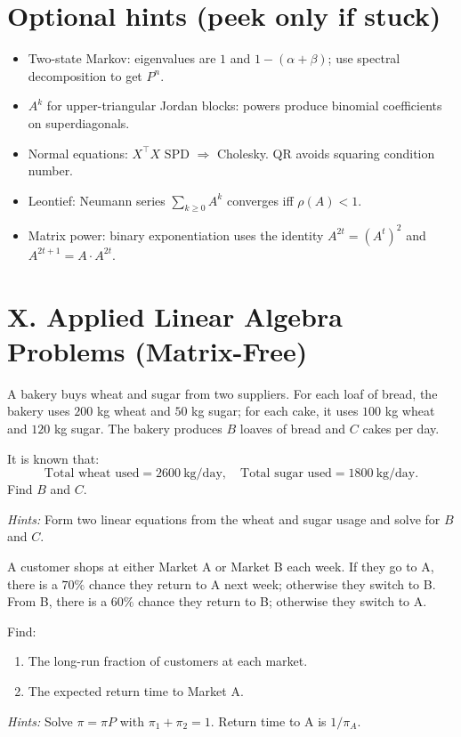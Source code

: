 \documentclass[11pt]{article}
\begin{document}
\section*{Optional hints (peek only if stuck)}
\begin{itemize}
\item Two-state Markov: eigenvalues are $1$ and $1-(\alpha+\beta)$; use spectral decomposition to get $P^n$.
\item $A^k$ for upper-triangular Jordan blocks: powers produce binomial coefficients on superdiagonals.
\item Normal equations: $X^\top X$ SPD $\Rightarrow$ Cholesky. QR avoids squaring condition number.
\item Leontief: Neumann series $\sum_{k\ge0}A^k$ converges iff $\rho(A)<1$.
\item Matrix power: binary exponentiation uses the identity $A^{2t}=(A^t)^2$ and $A^{2t+1}=A\cdot A^{2t}$.
\end{itemize}
\section*{X. Applied Linear Algebra Problems (Matrix-Free)}

\begin{problem}
A bakery buys wheat and sugar from two suppliers. For each loaf of bread, the bakery uses $200$ kg wheat and $50$ kg sugar; for each cake, it uses $100$ kg wheat and $120$ kg sugar. The bakery produces $B$ loaves of bread and $C$ cakes per day.

It is known that:
\[
\text{Total wheat used} = 2600 \ \mathrm{kg/day}, \quad
\text{Total sugar used} = 1800 \ \mathrm{kg/day}.
\]
Find $B$ and $C$.

\textit{Hints:}  
Form two linear equations from the wheat and sugar usage and solve for $B$ and $C$.
\end{problem}

\begin{problem}
A customer shops at either Market A or Market B each week. If they go to A, there is a $70\%$ chance they return to A next week; otherwise they switch to B. From B, there is a $60\%$ chance they return to B; otherwise they switch to A.

Find:
\begin{enumerate}
    \item The long-run fraction of customers at each market.
    \item The expected return time to Market A.
\end{enumerate}

\textit{Hints:}  
Solve $\pi = \pi P$ with $\pi_1 + \pi_2 = 1$. Return time to A is $1/\pi_A$.
\end{problem}
\end{document}
